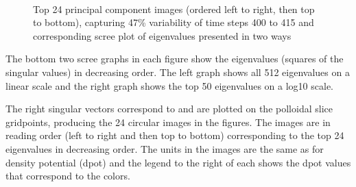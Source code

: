\begin{figure}[tbp]
  \begin{center}
    \\
    \\
    \\
    \\
    \\
    \\
    \caption{Top 24 principal component images (ordered left to right,
      then top to bottom), capturing 47\% variability of time steps
      400 to 415 and corresponding scree plot of eigenvalues presented
      in two ways}
  \label{fig:400}
  \end{center}
\end{figure}

The bottom two scree graphs in each figure show the eigenvalues (squares of
the singular values) in decreasing order. The left graph shows all 512
eigenvalues on a linear scale and the right graph shows the top 50
eigenvalues on a log10 scale.

The right singular vectors correspond to and are plotted on the
polloidal slice gridpoints, producing the 24 circular images in the
figures. The images are in reading order (left to right and then top to
bottom) corresponding to the top 24 eigenvalues in decreasing order. The units
in the images are the same as for density potential (dpot)
and the legend to the
right of each shows the dpot values that correspond to the colors.


